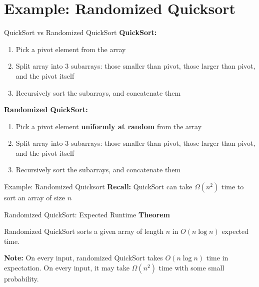\section{Example: Randomized Quicksort}

\begin{frame}{QuickSort vs Randomized QuickSort}
  \textbf{QuickSort:}
  \begin{enumerate}
    \item Pick a pivot element from the array \parencite{10.1093/comjnl/5.1.10}
    \item Split array into 3 subarrays: those smaller than pivot, those larger than pivot, and the pivot itself
    \item Recursively sort the subarrays, and concatenate them
  \end{enumerate}
  \vspace{1em}
  \textbf{Randomized QuickSort:}
  \begin{enumerate}
    \item Pick a pivot element \textbf{uniformly at random} from the array \parencite{motwani1995randomized}
    \item Split array into 3 subarrays: those smaller than pivot, those larger than pivot, and the pivot itself
    \item Recursively sort the subarrays, and concatenate them
  \end{enumerate}
\end{frame}

\begin{frame}{Example: Randomized Quicksort}
  \textbf{Recall:} QuickSort can take $\Omega(n^2)$ time to sort an array of size $n$ \parencite{359631}
\end{frame}

\begin{frame}{Randomized QuickSort: Expected Runtime}
  \textbf{Theorem}
  \begin{block}{}
    Randomized QuickSort sorts a given array of length $n$ in $O(n \log n)$ expected time. \parencite{journals/acta/Sedgewick77}
  \end{block}
  \vspace{1em}
  \textbf{Note:} On every input, randomized QuickSort takes $O(n \log n)$ time in expectation. On every input, it may take $\Omega(n^2)$ time with some small probability.
\end{frame}

